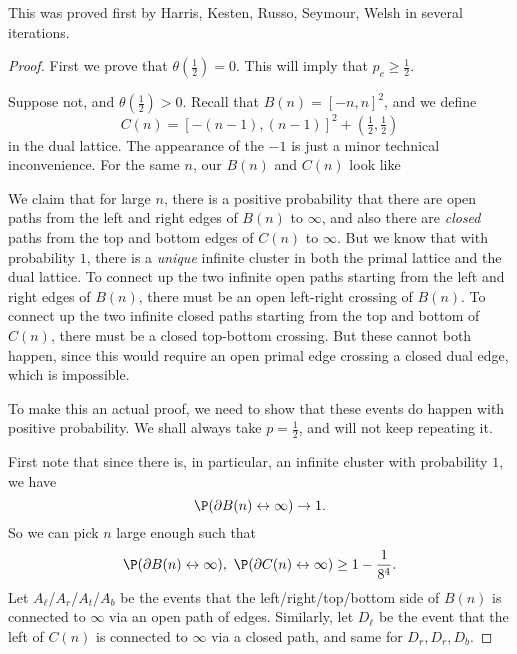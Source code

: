 \documentclass[a4paper]{article}
\begin{document}
This was proved first by Harris, Kesten, Russo, Seymour, Welsh in several iterations.
\begin{proof}
  First we prove that $\theta\left(\frac{1}{2}\right) = 0$. This will imply that $p_c \geq \frac{1}{2}$.

  Suppose not, and $\theta\left(\frac{1}{2}\right) > 0$. Recall that $B(n) = [-n, n]^2$, and we define
  \[
    C(n) = [-(n - 1), (n - 1)]^2 + \left(\tfrac{1}{2}, \tfrac{1}{2}\right)
  \]
  in the dual lattice. The appearance of the $-1$ is just a minor technical inconvenience. For the same $n$, our $B(n)$ and $C(n)$ look like
  \begin{center}
  \end{center}

  We claim that for large $n$, there is a positive probability that there are open paths from the left and right edges of $B(n)$ to $\infty$, and also there are \emph{closed} paths from the top and bottom edges of $C(n)$ to $\infty$. But we know that with probability $1$, there is a \emph{unique} infinite cluster in both the primal lattice and the dual lattice. To connect up the two infinite open paths starting from the left and right edges of $B(n)$, there must be an open left-right crossing of $B(n)$. To connect up the two infinite closed paths starting from the top and bottom of $C(n)$, there must be a closed top-bottom crossing. But these cannot both happen, since this would require an open primal edge crossing a closed dual edge, which is impossible.

  To make this an actual proof, we need to show that these events do happen with positive probability. We shall always take $p = \frac{1}{2}$, and will not keep repeating it.

  First note that since there is, in particular, an infinite cluster with probability $1$, we have
  \[
    \P(\partial B(n) \leftrightarrow \infty) \to 1.
  \]
  So we can pick $n$ large enough such that
  \[
    \P (\partial B(n) \leftrightarrow \infty),\ \P (\partial C(n) \leftrightarrow \infty) \geq 1 - \frac{1}{8^4}.
  \]
  Let $A_\ell$/$A_r$/$A_t$/$A_b$ be the events that the left/right/top/bottom side of $B(n)$ is connected to $\infty$ via an open path of edges. Similarly, let $D_\ell$ be the event that the left of $C(n)$ is connected to $\infty$ via a closed path, and same for $D_r, D_r, D_b$.


\end{proof}
\end{document}
